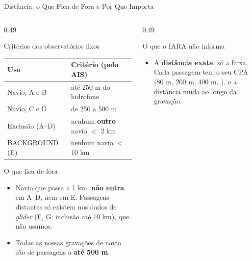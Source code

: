 \documentclass[aspectratio=169]{beamer}
\begin{document}
\begin{frame}{Distância: o Que Fica de Fora e Por Que Importa}
    \footnotesize
    \begin{columns}[T]
        \begin{column}{0.49\textwidth}
            \begin{block}{\small Critérios dos observatórios fixos}
                \scriptsize
                \centering
                \setlength{\tabcolsep}{4pt}
                \begin{tabular}{@{}ll@{}}
                    \toprule
                    Uso & Critério (pelo AIS) \\
                    \midrule
                    Navio, A e B & até 250 m do hidrofone \\
                    Navio, C e D & de 250 a 500 m \\
                    Exclusão (A--D) & nenhum \textbf{outro} navio $<$ 2 km \\
                    BACKGROUND (E) & nenhum navio $<$ 10 km \\
                    \bottomrule
                \end{tabular}
            \end{block}
            \begin{block}{\small O que fica de fora}
                \scriptsize
                \begin{itemize}
                    \setlength{\itemsep}{1pt}
                    \item Navio que passa a 1 km: \textbf{não entra} em A--D, nem em E. Passagens distantes só existem nos dados de \textit{glider} (F, G; inclusão até 10 km), que não usamos.
                    \item Todas as nossas gravações de navio são de passagens a \textbf{até 500 m}.
                \end{itemize}
            \end{block}
        \end{column}
        \begin{column}{0.49\textwidth}
            \begin{block}{\small O que o IARA não informa}
                \scriptsize
                \begin{itemize}
                    \setlength{\itemsep}{1pt}
                    \item A \textbf{distância exata}: só a faixa. Cada passagem tem o seu CPA (80 m, 200 m, 400 m\ldots), e a distância muda ao longo da gravação.

\end{itemize}
\end{block}
\end{column}
\end{columns}
\end{frame}
\end{document}
